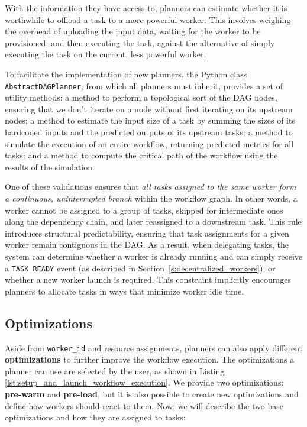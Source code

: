 With the information they have access to, planners can estimate whether it is worthwhile to offload a task to a more powerful worker. This involves weighing the overhead of uploading the input data, waiting for the worker to be provisioned, and then executing the task, against the alternative of simply executing the task on the current, less powerful worker.

To facilitate the implementation of new planners, the Python class \texttt{AbstractDAGPlanner}, from which all planners must inherit, provides a set of utility methods: a method to perform a topological sort of the DAG nodes, ensuring that we don't iterate on a node without first iterating on its upstream nodes; a method to estimate the input size of a task by summing the sizes of its hardcoded inputs and the predicted outputs of its upstream tasks; a method to simulate the execution of an entire workflow, returning predicted metrics for all tasks; and a method to compute the critical path of the workflow using the results of the simulation.

One of these validations ensures that \textit{all tasks assigned to the same worker form a continuous, uninterrupted branch} within the workflow graph. In other words, a worker cannot be assigned to a group of tasks, skipped for intermediate ones along the dependency chain, and later reassigned to a downstream task. This rule introduces structural predictability, ensuring that task assignments for a given worker remain contiguous in the DAG. As a result, when delegating tasks, the system can determine whether a worker is already running and can simply receive a \texttt{TASK\_READY} event (as described in Section~\ref{s:decentralized_workers}), or whether a new worker launch is required. This constraint implicitly encourages planners to allocate tasks in ways that minimize worker idle time.

\subsection{Optimizations}

Aside from \texttt{worker\_id} and resource assignments, planners can also apply different \textbf{optimizations} to further improve the workflow execution. The optimizations a planner can use are selected by the user, as shown in Listing \ref{lst:setup_and_launch_workflow_execution}. We provide two optimizations: \textbf{pre-warm} and \textbf{pre-load}, but it is also possible to create new optimizations and define how workers should react to them. Now, we will describe the two base optimizations and how they are assigned to tasks:

